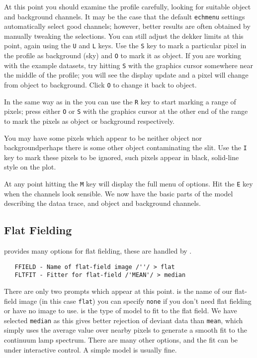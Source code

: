 At this point you should examine the profile carefully, looking for suitable
object and background channels.  It may be the case that the default
\verb+echmenu+ settings automatically select good channels; however, better
results are often obtained by manually tweaking the selections.
You can still adjust the dekker limits at this point, again using the
\verb+U+ and \verb+L+ keys.
Use the \verb+S+ key to mark a particular pixel in the profile as background
(sky) and \verb+O+ to mark it as object.  If you are working with the example
datasets, try hitting \verb+S+ with the graphics cursor somewhere near the
middle of the profile; you will see the display update and a pixel will
change from object to background.  Click \verb+O+ to change it back to
object.

In the same way as in the 
you can use the \verb+R+ key
to start marking a range of pixels; press either \verb+O+ or \verb+S+ with
the graphics cursor at the other end of the range to mark the pixels as
object or background respectively.

You may have some pixels which appear to be neither object nor
background\scspec{---}{ - }perhaps there is some other object contaminating
the slit.  Use the \verb+I+ key to mark these pixels to be ignored, such
pixels appear in black, solid-line style on the plot.

At any point hitting the \verb+M+ key will display the full menu of options.
Hit the \verb+E+ key when the channels look sensible.  We now have the basic
parts of the model describing the data\scspec{---}{ - }a trace, and object
and background channels.


\subsection{Flat Fielding}

provides many options for flat fielding, these are handled by
.

{
\scspec{\small}{ }
\begin{verbatim}
   FFIELD - Name of flat-field image /''/ > flat
   FLTFIT - Fitter for flat-field /'MEAN'/ > median
\end{verbatim}
}

There are only two prompts which appear at this point.
 is the name of our flat-field
image (in this case \verb+flat+) you can specify
\verb+none+ if you don't need flat fielding or have no image to use.
 is the type of model to fit
to the flat field.
We have selected \verb+median+ as this gives better rejection of deviant
data than \verb+mean+, which simply uses the average value over nearby
pixels to generate a smooth fit to the continuum lamp spectrum.
There are many other options, and the fit can be under interactive control.
A simple model is usually fine.


